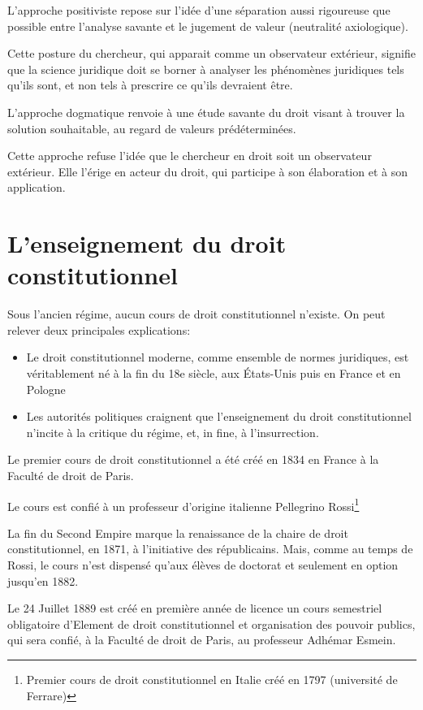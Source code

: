 ﻿\documentclass[12pt, a4paper, openany]{book}
\begin{document}
\begin{itemize}
L'approche positiviste repose sur l'idée d'une séparation aussi rigoureuse que possible entre l'analyse savante et le jugement de valeur (neutralité axiologique).

Cette posture du chercheur, qui apparait comme un observateur extérieur, signifie que la science juridique doit se borner à analyser les phénomènes juridiques tels qu'ils sont, et non tels à prescrire ce qu'ils devraient être.

L'approche dogmatique renvoie à une étude savante du droit visant à trouver la solution souhaitable, au regard de valeurs prédéterminées. 

Cette approche refuse l'idée que le chercheur en droit soit un observateur extérieur. Elle l'érige en acteur du droit, qui participe à son élaboration et à son application.

	\section{L'enseignement du droit constitutionnel}

Sous l'ancien régime, aucun cours de droit constitutionnel n'existe. On peut relever deux principales explications:
\begin{itemize}
\item Le droit constitutionnel moderne, comme ensemble de normes juridiques, est véritablement né à la fin du 18e siècle, aux États-Unis puis en France et en Pologne
\item Les autorités politiques craignent que l'enseignement du droit constitutionnel n'incite à la critique du régime, et, in fine, à l'insurrection.
\end{itemize}

Le premier cours de droit constitutionnel a été créé en 1834 en France à la Faculté de droit de Paris.

Le cours est confié à un professeur d'origine italienne Pellegrino Rossi\footnote{Premier cours de droit constitutionnel en Italie créé en 1797 (université de Ferrare)}

La fin du Second Empire marque la renaissance de la chaire de droit constitutionnel, en 1871, à l'initiative des républicains. Mais, comme au temps de Rossi, le cours n'est dispensé qu'aux élèves de doctorat et seulement en option jusqu'en 1882.

Le 24 Juillet 1889 est créé en première année de licence un cours semestriel obligatoire d'Element de droit constitutionnel et organisation des pouvoir publics, qui sera confié, à la Faculté de droit de Paris, au professeur Adhémar Esmein.


\end{itemize}
\end{document}
